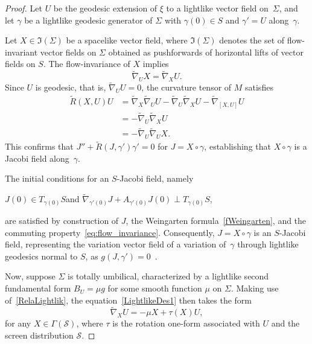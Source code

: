 \documentclass[11pt]{article}
\numberwithin{equation}{section}
\begin{document}
	\begin{proof}
		Let $U$ be the geodesic extension of $\xi$ to a lightlike vector field on~$\Sigma$, and let $\gamma$ be a lightlike geodesic generator of $\Sigma$ with $\gamma(0) \in S$ and $\gamma' = U$ along~$\gamma$.
		
		Let $X \in \mathfrak{I}(\Sigma)$ be a spacelike vector field, where $\mathfrak{I}(\Sigma)$ denotes the set of flow-invariant vector fields on $\Sigma$ obtained as pushforwards of horizontal lifts of vector fields on $S$. The flow-invariance of $X$ implies
		\begin{equation}\label{eq:flow_invariance}
			\widetilde{\nabla}_U X = \widetilde{\nabla}_X U.
		\end{equation}
		Since $U$ is geodesic, that is, $\widetilde{\nabla}_U U = 0$, the curvature tensor of $M$ satisfies
		\begin{align}
			\widetilde{R}(X, U)U &= \widetilde{\nabla}_X \widetilde{\nabla}_U U - \widetilde{\nabla}_U \widetilde{\nabla}_X U - \widetilde{\nabla}_{[X, U]} U \nonumber \\
			&= -\widetilde{\nabla}_U \widetilde{\nabla}_X U \label{Eq:R_JacobiOp} \\
			&= -\widetilde{\nabla}_U \widetilde{\nabla}_U X. \nonumber
		\end{align}
		This confirms that $J'' + \widetilde{R}(J, \gamma')\gamma' = 0$ for $J = X \circ \gamma$, establishing that $X \circ \gamma$ is a Jacobi field along~$\gamma$.
		
		The initial conditions for an $S$-Jacobi field, namely
		\begin{center}
			$J(0) \in T_{\gamma(0)}S$\quad and \quad$\widetilde{\nabla}_{\gamma'(0)} J + A_{\gamma'(0)}J(0) \perp T_{\gamma(0)}S$,
		\end{center}
		are satisfied by construction of $J$, the Weingarten formula~\eqref{fWeingarten}, and the commuting property~\eqref{eq:flow_invariance}. Consequently, $J = X \circ \gamma$ is an $S$-Jacobi field, representing the variation vector field of a variation of~$\gamma$ through lightlike geodesics normal to $S$, as $g(J,\gamma')=0$~\cite[Cor.~10.40]{oneill}.
		
		Now, suppose $\Sigma$ is totally umbilical, characterized by a lightlike second fundamental form $B_U = \mu g$ for some smooth function $\mu$ on $\Sigma$. Making use of~\eqref{RelaLightlik}, the equation~\eqref{LightlikeDes1} then takes the form
		\begin{equation}
			\widetilde{\nabla}_X U = -\mu X + \tau(X) U, \label{Eq:nablaXU}
		\end{equation}
		for any $X \in \Gamma({\mathcal S})$, where $\tau$ is the rotation one-form associated with $U$ and the screen distribution $\mathcal{S}$.
		

\end{proof}
\end{document}
